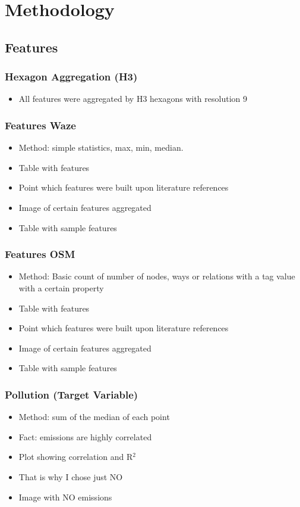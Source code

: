 \section{Methodology}
\subsection{Features}
\subsubsection{Hexagon Aggregation (H3)}
\begin{itemize}
\item All features were aggregated by H3 hexagons with resolution 9 
\end{itemize}

\subsubsection{Features Waze}
\begin{itemize}
\item Method: simple statistics, max, min, median. 
\item Table with features
\item Point which features were built upon literature references
\item Image of certain features aggregated
\item Table with sample features
\end{itemize}

\subsubsection{Features OSM}
\begin{itemize}
\item Method: Basic count of number of nodes, ways or relations with a tag value with a certain property
\item Table with features
\item Point which features were built upon literature references
\item Image of certain features aggregated
\item Table with sample features
\end{itemize}

\subsubsection{Pollution (Target Variable)}
\begin{itemize}
\item Method: sum of the median of each point
\item Fact: emissions are highly correlated
\item Plot showing correlation and R$^2$ 
\item That is why I chose just NO
\item Image with NO emissions
\end{itemize}

